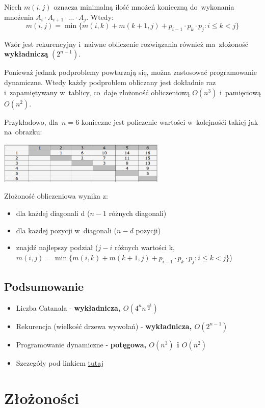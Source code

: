 Niech $m(i,j)$ oznacza minimalną ilość mnożeń konieczną do~wykonania mnożenia $A_i \cdot A_{i+1} \cdot ... \cdot A_{j}$. Wtedy:
$$ m(i,j) = \min\{m(i,k) + m(k+1, j) + p_{i-1} \cdot p_k \cdot p_j : i \le k < j\}$$

Wzór jest rekurencyjny i~naiwne obliczenie rozwiązania również ma~złożoność \textbf{wykładniczą} $(2^{n-1})$.

Ponieważ jednak podproblemy powtarzają się, można zastosować programowanie dynamiczne. Wtedy każdy podproblem obliczany jest dokładnie raz i~zapamiętywany w~tablicy, co~daje złożoność obliczeniową $O(n^3)$ i~pamięciową $O(n^2)$.

Przykładowo, dla~$n=6$ konieczne jest policzenie wartości w~kolejnośći takiej jak na~obrazku:
\begin{center}
 \includegraphics[width=8cm]{diagon}
\end{center}
Złożoność obliczeniowa wynika z:
\begin{itemize}
 \item dla każdej diagonali d ($n - 1$ różnych diagonali)
 \item dla każdej pozycji w~diagonali ($n - d$ pozycji)
 \item znajdź najlepszy podział ($j - i$ różnych wartości k, $ m(i,j) = \min\{m(i,k) + m(k+1, j) + p_{i-1} \cdot p_k \cdot p_j : i \le k < j\}$)
\end{itemize}

\subsection{Podsumowanie}
\begin{itemize}
\item Liczba Catanala - \textbf{wykładnicza, $O(4^nn^\frac{-3}{2})$}
\item Rekurencja (wielkość drzewa wywołań) - \textbf{wykładnicza, $O(2^{n-1})$}
\item Programowanie dynamiczne - \textbf{potęgowa, $O(n^3)$ i $O(n^2)$}
\item Szczegóły pod linkiem \href{http://edu.pjwstk.edu.pl/wyklady/asd/scb/asd14/main14_p2.html}{tutaj}
\end{itemize}

\section{Złożoności}

